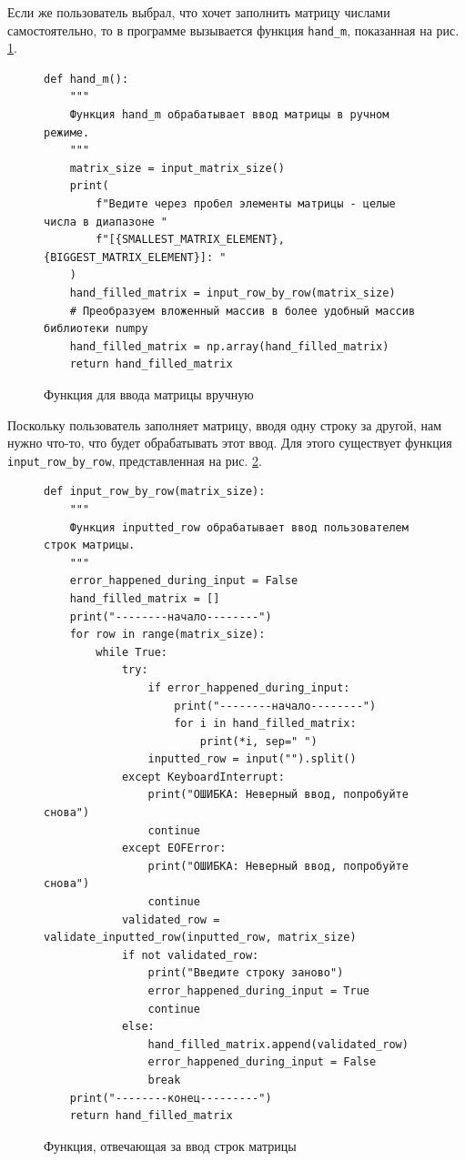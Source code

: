 \documentclass{mirea}
\begin{document}
Если же пользователь выбрал, что хочет заполнить матрицу числами самостоятельно, то в программе вызывается функция \texttt{hand\_m}, показанная на рис. \ref{func:handm}.
\begin{figure}[ht]
	\begin{verbatim}
def hand_m():
    """
    Функция hand_m обрабатывает ввод матрицы в ручном режиме.
    """
    matrix_size = input_matrix_size()
    print(
        f"Ведите через пробел элементы матрицы - целые числа в диапазоне "
        f"[{SMALLEST_MATRIX_ELEMENT}, {BIGGEST_MATRIX_ELEMENT}]: "
    )
    hand_filled_matrix = input_row_by_row(matrix_size)
    # Преобразуем вложенный массив в более удобный массив библиотеки numpy
    hand_filled_matrix = np.array(hand_filled_matrix)
    return hand_filled_matrix
	\end{verbatim}
	\caption{Функция для ввода матрицы вручную}
	\label{func:handm}
\end{figure}

Поскольку пользователь заполняет матрицу, вводя одну строку за другой, нам нужно что-то, что будет обрабатывать этот ввод. Для этого существует функция \texttt{input\_row\_by\_row}, представленная на рис. \ref{func:input row}.
\begin{figure}[ht]
	\begin{verbatim}
def input_row_by_row(matrix_size):
    """
    Функция inputted_row обрабатывает ввод пользователем строк матрицы.
    """
    error_happened_during_input = False
    hand_filled_matrix = []
    print("--------начало--------")
    for row in range(matrix_size):
        while True:
            try:
                if error_happened_during_input:
                    print("--------начало--------")
                    for i in hand_filled_matrix:
                        print(*i, sep=" ")
                inputted_row = input("").split()
            except KeyboardInterrupt:
                print("ОШИБКА: Неверный ввод, попробуйте снова")
                continue
            except EOFError:
                print("ОШИБКА: Неверный ввод, попробуйте снова")
                continue
            validated_row = validate_inputted_row(inputted_row, matrix_size)
            if not validated_row:
                print("Введите строку заново")
                error_happened_during_input = True
                continue
            else:
                hand_filled_matrix.append(validated_row)
                error_happened_during_input = False
                break
    print("--------конец---------")
    return hand_filled_matrix
	\end{verbatim}
	\caption{Функция, отвечающая за ввод строк матрицы}
	\label{func:input row}
\end{figure}
\end{document}

